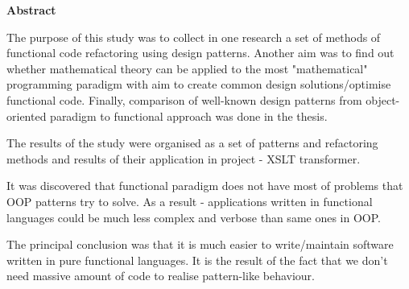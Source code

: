 \begin{center}
\textbf{\large Abstract}
\end{center}

The purpose of this study was to collect in one research a set of methods of functional code refactoring using design patterns.
Another aim was to find out whether mathematical theory can be applied to the most "mathematical" programming paradigm with aim to create common design solutions/optimise functional code. Finally, comparison of well-known design patterns from object-oriented paradigm to functional approach was done in the thesis.

The results of the study were organised as a set of patterns and refactoring methods and results of their application in project - XSLT transformer.

It was discovered that functional paradigm does not have most of problems that OOP patterns try to solve. As a result - applications written in functional languages could be much less complex and verbose than same ones in OOP.

The principal conclusion was that it is much easier to write/maintain software written in pure functional languages. It is the result of the fact that we don't need massive amount of code to realise pattern-like behaviour.

\vspace{1cm}
